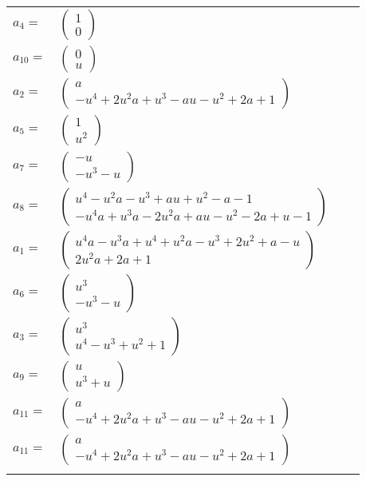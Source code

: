 \documentclass[1p]{elsarticle_modified}
\theoremstyle{definition}
\begin{document}
\begin{tabular}{m{7pt} m{180pt} m{7pt} m{180pt} }
\flushright $a_{4}=$&$\begin{pmatrix}1\\0\end{pmatrix}$ \\
\flushright $a_{10}=$&$\begin{pmatrix}0\\u\end{pmatrix}$ \\
\flushright $a_{2}=$&$\begin{pmatrix}a\\- u^4+2 u^2 a+u^3- a u- u^2+2 a+1\end{pmatrix}$ \\
\flushright $a_{5}=$&$\begin{pmatrix}1\\u^2\end{pmatrix}$ \\
\flushright $a_{7}=$&$\begin{pmatrix}- u\\- u^3- u\end{pmatrix}$ \\
\flushright $a_{8}=$&$\begin{pmatrix}u^4- u^2 a- u^3+a u+u^2- a-1\\- u^4 a+u^3 a-2 u^2 a+a u- u^2-2 a+u-1\end{pmatrix}$ \\
\flushright $a_{1}=$&$\begin{pmatrix}u^4 a- u^3 a+u^4+u^2 a- u^3+2 u^2+a- u\\2 u^2 a+2 a+1\end{pmatrix}$ \\
\flushright $a_{6}=$&$\begin{pmatrix}u^3\\- u^3- u\end{pmatrix}$ \\
\flushright $a_{3}=$&$\begin{pmatrix}u^3\\u^4- u^3+u^2+1\end{pmatrix}$ \\
\flushright $a_{9}=$&$\begin{pmatrix}u\\u^3+u\end{pmatrix}$ \\
\flushright $a_{11}=$&$\begin{pmatrix}a\\- u^4+2 u^2 a+u^3- a u- u^2+2 a+1\end{pmatrix}$\\ \flushright $a_{11}=$&$\begin{pmatrix}a\\- u^4+2 u^2 a+u^3- a u- u^2+2 a+1\end{pmatrix}$\\&\end{tabular}
\end{document}
